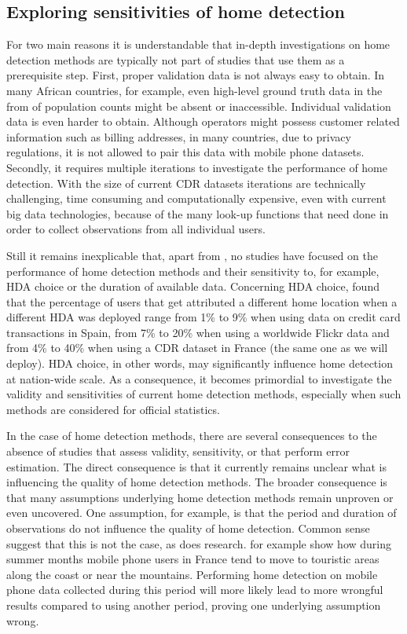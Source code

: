 \documentclass[a4paper]{article}
\begin{document}
\subsection{Exploring sensitivities of home detection}
For two main reasons it is understandable that in-depth investigations on home detection methods are typically not part of studies that use them as a prerequisite step. First, proper validation data is not always easy to obtain. In many African countries, for example, even high-level ground truth data in the from of population counts might be absent or inaccessible. Individual validation data is even harder to obtain. Although operators might possess customer related information such as billing addresses, in many countries, due to privacy regulations, it is not allowed to pair this data with mobile phone datasets. Secondly, it requires multiple iterations to investigate the performance of home detection. With the size of current CDR datasets iterations are technically challenging, time consuming and computationally expensive, even with current big data technologies, because of the many look-up functions that need done in order to collect observations from all individual users.   

Still it remains inexplicable that, apart from \cite{Vanhoof_JOS,Bojic2015}, no studies have focused on the performance of home detection methods and their sensitivity to, for example, HDA choice or the duration of available data. Concerning HDA choice, \cite{Vanhoof_JOS,Bojic2015} found that the percentage of users that get attributed a different home location when a different HDA was deployed range from 1\% to 9\% when using data on credit card transactions in Spain, from 7\% to 20\% when using a worldwide Flickr data and from 4\% to 40\% when using a CDR dataset in France (the same one as we will deploy). HDA choice, in other words, may significantly influence home detection at nation-wide scale. As a consequence, it becomes primordial to investigate the validity and sensitivities of current home detection methods, especially when such methods are considered for official statistics.   

In the case of home detection methods, there are several consequences to the absence of studies that assess validity, sensitivity, or that perform error estimation. The direct consequence is that it currently remains unclear what is influencing the quality of home detection methods. The broader consequence is that many assumptions underlying home detection methods remain unproven or even uncovered. One assumption, for example, is that the period and duration of observations do not influence the quality of home detection. Common sense suggest that this is not the case, as does research. \cite{Deville2014,Vanhoof_domestictourism} for example show how during summer months mobile phone users in France tend to move to touristic areas along the coast or near the mountains. Performing home detection on mobile phone data collected during this period will more likely lead to more wrongful results compared to using another period, proving one underlying assumption wrong.
\end{document}
